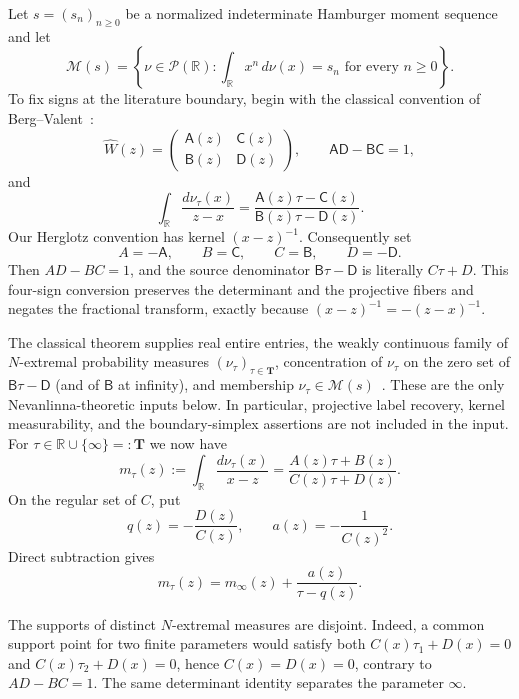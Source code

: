 \documentclass[11pt]{article}
\newcommand{\R}{\mathbb R}
\newcommand{\cM}{\mathcal M}
\newcommand{\cP}{\mathcal P}
\begin{document}
Let $s=(s_n)_{n\geq0}$ be a normalized indeterminate Hamburger moment sequence and let
\[
  \cM(s)=\left\{\nu\in\cP(\R):\int_{\R}x^n\,d\nu(x)=s_n
  \text{ for every }n\geq0\right\}.
\]
To fix signs at the literature boundary, begin with the classical convention of
Berg--Valent~\cite[\S2.1]{BergValent1994}:
\[
 \widehat W(z)=
 \begin{pmatrix}\mathsf A(z)&\mathsf C(z)\\
                 \mathsf B(z)&\mathsf D(z)\end{pmatrix},
 \qquad \mathsf A\mathsf D-\mathsf B\mathsf C=1,
\]
and
\[
 \int_{\R}\frac{d\nu_\tau(x)}{z-x}
   =\frac{\mathsf A(z)\tau-\mathsf C(z)}
          {\mathsf B(z)\tau-\mathsf D(z)}.
\]
Our Herglotz convention has kernel $(x-z)^{-1}$.  Consequently set
\[
  A=-\mathsf A,\qquad B=\mathsf C,\qquad
  C=\mathsf B,\qquad D=-\mathsf D.
\]
Then $AD-BC=1$, and the source denominator
$\mathsf B\tau-\mathsf D$ is literally $C\tau+D$.  This four-sign conversion preserves the
determinant and the projective fibers and negates the fractional transform, exactly because
$(x-z)^{-1}=-(z-x)^{-1}$.

The classical theorem supplies real entire entries, the weakly continuous family of
$N$-extremal probability measures $(\nu_\tau)_{\tau\in\mathbf T}$, concentration of
$\nu_\tau$ on the zero set of $\mathsf B\tau-\mathsf D$ (and of $\mathsf B$ at infinity),
and membership $\nu_\tau\in\cM(s)$~\cite{Akhiezer1965,BergValent1994,PrucknerEtAl2023}.
These are the only Nevanlinna-theoretic inputs below.  In particular, projective label recovery,
kernel measurability, and the boundary-simplex assertions are not included in the input.
For $\tau\in\R\cup\{\infty\}=:\mathbf T$ we now have
\begin{equation}\label{eq:nev-family}
  m_\tau(z):=\int_{\R}\frac{d\nu_\tau(x)}{x-z}
  =\frac{A(z)\tau+B(z)}{C(z)\tau+D(z)}.
\end{equation}
On the regular set of $C$, put
\begin{equation}\label{eq:q}
  q(z)=-\frac{D(z)}{C(z)},\qquad
  a(z)=-\frac{1}{C(z)^2}.
\end{equation}
Direct subtraction gives
\begin{equation}\label{eq:mobius-difference}
  m_\tau(z)=m_\infty(z)+\frac{a(z)}{\tau-q(z)}.
\end{equation}

The supports of distinct $N$-extremal measures are disjoint.  Indeed, a common support point for
two finite parameters would satisfy both $C(x)\tau_1+D(x)=0$ and
$C(x)\tau_2+D(x)=0$, hence $C(x)=D(x)=0$, contrary to
$AD-BC=1$.  The same determinant identity separates the parameter $\infty$.
\end{document}
